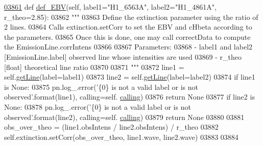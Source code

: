 \begin{DoxyCode}
\hypertarget{classpyneb_1_1core_1_1pynebcore_1_1_observation_l03861}{}\hyperlink{classpyneb_1_1core_1_1pynebcore_1_1_observation_ab01150e82809bd712a1b1f09d250db94}{03861}     \textcolor{keyword}{def }\hyperlink{classpyneb_1_1core_1_1pynebcore_1_1_observation_ab01150e82809bd712a1b1f09d250db94}{def\_EBV}(self, label1="H1\_6563A", label2="H1\_4861A", r\_theo=2.85):
03862         \textcolor{stringliteral}{"""}
03863 \textcolor{stringliteral}{        Define the extinction parameter using the ratio of 2 lines.}
03864 \textcolor{stringliteral}{        Calls extinction.setCorr to set the EBV and cHbeta according to the parameters.}
03865 \textcolor{stringliteral}{        Once this is done, one may call correctData to compute the EmissionLine.corrIntens}
03866 \textcolor{stringliteral}{        }
03867 \textcolor{stringliteral}{        Parameters:}
03868 \textcolor{stringliteral}{            - label1 and label2 [EmissionLine.label] observed line whose intensities are used}
03869 \textcolor{stringliteral}{            - r\_theo [float] theoretical line ratio}
03870 \textcolor{stringliteral}{}
03871 \textcolor{stringliteral}{        """}
03872         line1 = self.\hyperlink{classpyneb_1_1core_1_1pynebcore_1_1_observation_a9994c84a500a6a31a5376ed6c7782ce3}{getLine}(label=label1)
03873         line2 = self.\hyperlink{classpyneb_1_1core_1_1pynebcore_1_1_observation_a9994c84a500a6a31a5376ed6c7782ce3}{getLine}(label=label2)
03874         \textcolor{keywordflow}{if} line1 \textcolor{keywordflow}{is} \textcolor{keywordtype}{None}:
03875             pn.log\_.error(\textcolor{stringliteral}{'\{0\} is not a valid label or is not observed'}.format(line1), calling=self.
      \hyperlink{classpyneb_1_1core_1_1pynebcore_1_1_observation_a2639fad9af4fefad20e4097295bd40e7}{calling})
03876             \textcolor{keywordflow}{return} \textcolor{keywordtype}{None}
03877         \textcolor{keywordflow}{if} line2 \textcolor{keywordflow}{is} \textcolor{keywordtype}{None}:
03878             pn.log\_.error(\textcolor{stringliteral}{'\{0\} is not a valid label or is not observed'}.format(line2), calling=self.
      \hyperlink{classpyneb_1_1core_1_1pynebcore_1_1_observation_a2639fad9af4fefad20e4097295bd40e7}{calling})
03879             \textcolor{keywordflow}{return} \textcolor{keywordtype}{None}
03880 
03881         obs\_over\_theo = (line1.obsIntens / line2.obsIntens) / r\_theo 
03882         self.extinction.setCorr(obs\_over\_theo, line1.wave, line2.wave)
03883         
03884  
\end{DoxyCode}
\hypertarget{classpyneb_1_1core_1_1pynebcore_1_1_observation_a106a6b30219b5d9778713936c2a3064d}{}
